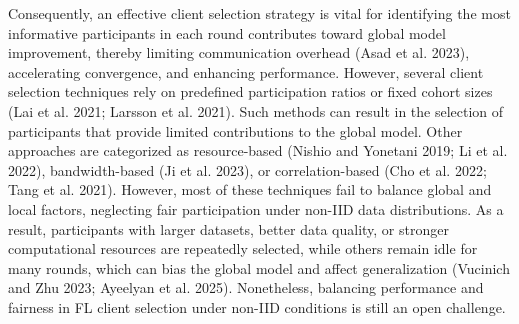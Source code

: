 \documentclass[pdflatex,sn-mathphys-num,oneside]{sn-jnl}%
\theoremstyle{thmstyleone}%
\theoremstyle{thmstyletwo}%
\theoremstyle{thmstylethree}%
\begin{document}
Consequently, an effective client selection strategy is vital for identifying the most informative participants in each round contributes toward global model improvement, thereby limiting communication overhead (Asad et al. 2023), accelerating convergence, and enhancing performance. However, several client selection techniques rely on predefined participation ratios or fixed cohort sizes (Lai et al. 2021; Larsson et al. 2021). Such methods can result in the selection of participants that provide limited contributions to the global model. Other approaches are categorized as resource-based (Nishio and Yonetani 2019; Li et al. 2022), bandwidth-based (Ji et al. 2023), or correlation-based (Cho et al. 2022; Tang et al. 2021). However, most of these techniques fail to balance global and local factors, neglecting fair participation under non-IID data distributions. As a result, participants with larger datasets, better data quality, or stronger computational resources are repeatedly selected, while others remain idle for many rounds, which can bias the global model and affect generalization (Vucinich and Zhu 2023; Ayeelyan et al. 2025). Nonetheless, balancing performance and fairness in FL client selection under non-IID conditions is still an open challenge.
\end{document}
